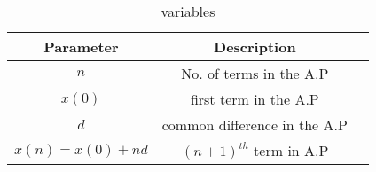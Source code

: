 

\begin{table}[h]
  \centering
  \renewcommand{\arraystretch}{1.5}
\begin{tabular}{|c|c|c|}
\hline
Parameter & Description \\\hline
\( n \) & No. of terms in the A.P  \\\hline
\(x(0) \) & first term in the A.P \\\hline
\( d \) & common difference in the A.P  \\\hline
\(x(n)=x(0)+nd\) & $(n+1)^{th}$ term in A.P\\ \hline
\end{tabular}
\caption{variables}
  \label{tab:xn}
\end{table}
